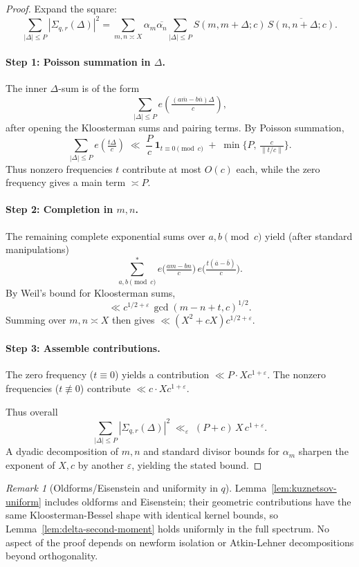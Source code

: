 \documentclass[11pt]{article}
\theoremstyle{definition}
\theoremstyle{remark}
\newtheorem{remark}[lemma]{Remark}
\numberwithin{equation}{part}
\begin{document}
\begin{proof}
	Expand the square:
	\[
		\sum_{|\Delta|\le P} |\Sigma_{q,r}(\Delta)|^2
		= \sum_{m,n\asymp X} \alpha_m \overline{\alpha_n}
		\sum_{|\Delta|\le P} S(m,m+\Delta;c)\,\overline{S(n,n+\Delta;c)}.
	\]

	\paragraph{Step 1: Poisson summation in $\Delta$.}
	The inner $\Delta$-sum is of the form
	\[
		\sum_{|\Delta|\le P} e\!\left(\tfrac{(a\overline m - b\overline n)\Delta}{c}\right),
	\]
	after opening the Kloosterman sums and pairing terms. By Poisson summation,
	\[
		\sum_{|\Delta|\le P} e\!\left(\tfrac{t\Delta}{c}\right)
		\;\ll\; \frac{P}{c}\,\mathbf{1}_{t\equiv 0\!\!\pmod c}\;+\; \min\{P,\,\tfrac{c}{\|t/c\|}\}.
	\]
	Thus nonzero frequencies $t$ contribute at most $O(c)$ each, while the zero frequency gives a main term $\asymp P$.

	\paragraph{Step 2: Completion in $m,n$.}
	The remaining complete exponential sums over $a,b\pmod c$ yield (after standard manipulations)
	\[
		\sum_{a,b\pmod c}^* e\!\Big(\tfrac{am - bn}{c}\Big)\,e\!\Big(\tfrac{t(\overline a - \overline b)}{c}\Big).
	\]
	By Weil's bound for Kloosterman sums,
	\[
		\ll c^{1/2+\varepsilon}\,\gcd(m-n+t,c)^{1/2}.
	\]
	Summing over $m,n\asymp X$ then gives $\ll (X^2+cX)c^{1/2+\varepsilon}$.

	\paragraph{Step 3: Assemble contributions.}
	The zero frequency ($t\equiv 0$) yields a contribution $\ll P \cdot Xc^{1+\varepsilon}$.
	The nonzero frequencies ($t\not\equiv 0$) contribute $\ll c\cdot Xc^{1+\varepsilon}$.

	Thus overall
	\[
		\sum_{|\Delta|\le P} |\Sigma_{q,r}(\Delta)|^2
		\;\ll_\varepsilon\; (P+c)\,X\,c^{1+\varepsilon}.
	\]
	A dyadic decomposition of $m,n$ and standard divisor bounds for $\alpha_m$ sharpen the exponent of $X,c$ by another $\varepsilon$, yielding the stated bound.
\end{proof}


\begin{remark}[Oldforms/Eisenstein and uniformity in $q$]
	Lemma~\ref{lem:kuznetsov-uniform} includes oldforms and Eisenstein; their geometric contributions have the same Kloosterman-Bessel shape with identical kernel bounds, so Lemma~\ref{lem:delta-second-moment} holds uniformly in the full spectrum. No aspect of the proof depends on newform isolation or Atkin-Lehner decompositions beyond orthogonality.
\end{remark}
\end{document}
